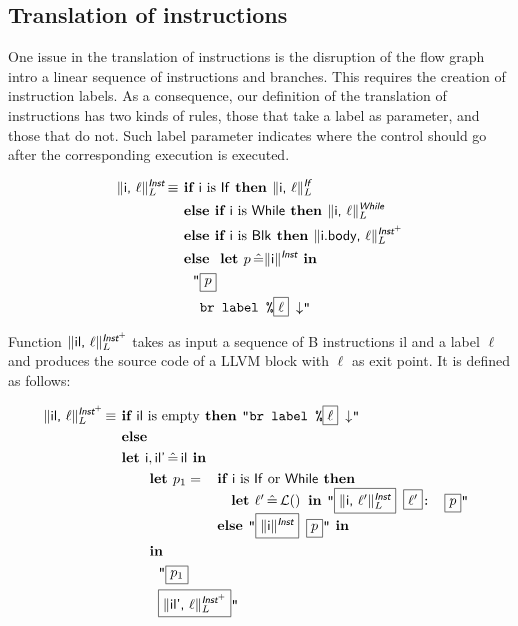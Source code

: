 \documentclass{llncs}
\newcommand{\trad}[2]{\ensuremath{\lVert \textsf{#1} \rVert^{\textit{#2}}}}
\newcommand{\nl}[0]{\ensuremath{\downarrow}}
\DeclareMathOperator{\isdef}{\equiv}
\DeclareMathOperator{\lbl}{\mathcal{L}()}
\newcommand{\llvm}[1]{\texttt{#1}}
\newcommand{\B}[1]{\textsf{#1}}
\newcommand{\ListOf}[1]{$\mbox{#1}^+$}
\newcommand{\IF}[0]{\textbf{ if }}
\newcommand{\ELSIF}[0]{\textbf{ else if }}
\newcommand{\ELSE}[0]{\textbf{ else }}
\newcommand{\THEN}[0]{\textbf{ then }}
\newcommand{\LET}[0]{\textbf{ let }}
\DeclareMathOperator{\BE}{\hat{=}}
\newcommand{\IN}[0]{\textbf{ in }}
\newcommand{\PH}[1]{\framebox{$#1$}}
\begin{document}
\subsection{Translation of instructions}
\label{sec:trad-instr}

One issue in the translation of instructions is the disruption of the flow graph
intro a linear sequence of instructions and branches. This requires the creation
of instruction labels. As a consequence, our definition of the translation of
instructions has two kinds of rules, those that take a label as parameter, and
those that do not. Such label parameter indicates where the control should go
after the corresponding execution is executed.

\begin{align*}
\trad{\B{i}, $\ell$}{\B{Inst}}_L \isdef
& \IF \B{i} \mbox{ is \B{If}} \THEN \trad{\B{i}, $\ell$}{\B{If}}_L \\
& \ELSIF \B{i} \mbox{ is \B{While}} \THEN \trad{\B{i}, $\ell$}{\B{While}}_L \\
& \ELSIF \B{i} \mbox{ is \B{Blk}} \THEN \trad{\B{i.body}, $\ell$}{\ListOf{\B{Inst}}}_L \\
& \ELSE \LET p \BE \trad{\B{i}}{\B{Inst}} \IN \\
& \quad \llvm{"\PH{p}} \\
& \quad \llvm{ br label \%\PH{\ell} \nl"}
\end{align*}

Function $\trad{\B{il}, $\ell$}{\ListOf{\B{Inst}}}_L$ takes as input a sequence
of B instructions \B{il} and a label $\ell$ and produces the source code of a
LLVM block with $\ell$ as exit point. It is defined as follows:

\begin{align*}
\trad{\B{il}, $\ell$}{\ListOf{\B{Inst}}}_L \isdef & \IF \B{il} \mbox{ is empty} \THEN \llvm{"br label \%\PH{\ell} \nl"} \\
& \ELSE \\
& \LET \B{i}, \B{il'} \BE \B{il}  \IN \\
& \quad \quad \LET p_1 =
\begin{array}[t]{l}
  \IF \B{i} \mbox{ is \B{If} or \B{While}} \THEN \\
  \quad \LET \ell' \BE \lbl \IN \llvm{"\PH{\trad{i, $\ell'$}{\B{Inst}}_L} \PH{\ell'}: \PH{p}"} \\
  \ELSE \llvm{"\PH{\trad{i}{\B{Inst}}} \PH{p}"} \IN
\end{array} \\
& \quad \quad \IN \\
& \quad \quad \quad \llvm{"\PH{p_1}} \\
& \quad \quad \quad \llvm{\PH{\trad{il', $\ell$}{\ListOf{\B{Inst}}}_L}"}
\end{align*}
\end{document}
